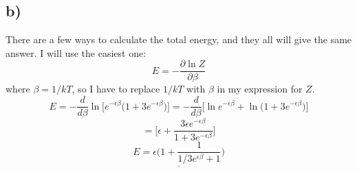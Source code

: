 \documentclass{scrartcl}
\begin{document}
\subsection*{b)}
There are a few ways to calculate the total energy, and they all will give the same answer. I will use the easiest one:
\begin{equation}
E=-\frac{\partial \ln Z}{\partial \beta}
\end{equation}
where $\beta=1/kT$, so I have to replace $1/kT$ with $\beta$ in my expression for $Z$.
$$E=-\frac{d}{d\beta}\ln\Bigg[e^{-\epsilon \beta}\bigg(1+3e^{-\epsilon \beta}\bigg)\Bigg]=-\frac{d}{d\beta}\Bigg[\ln e^{-\epsilon \beta}+\ln\bigg(1+3e^{-\epsilon \beta}\bigg)\Bigg]$$
$$=\Bigg[\epsilon + \frac{3\epsilon e^{-\epsilon \beta}}{1+3e^{-\epsilon \beta}}\Bigg]$$
\begin{equation}
\underline{E=\epsilon\bigg(1+\frac{1}{1/3e^{\epsilon \beta}+1}\bigg)}
\end{equation}
\end{document}
